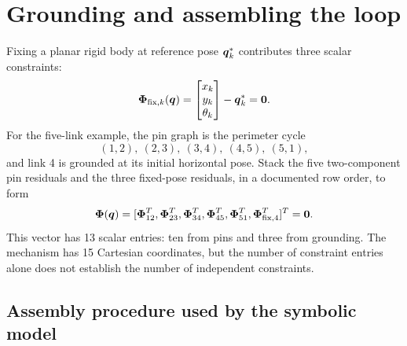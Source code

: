 \documentclass[../main.tex]{subfiles}
\begin{document}
\section{Grounding and assembling the loop}

Fixing a planar rigid body at reference pose $\boldsymbol{q}_k^*$ contributes three scalar constraints:
\begin{equation}
	\boldsymbol{\Phi}_{\mathrm{fix},k}(\boldsymbol{q})
	=\begin{bmatrix}x_k\\y_k\\\theta_k\end{bmatrix}-\boldsymbol{q}_k^*
	=\boldsymbol{0}.
	\label{eq:fixed-pose-constraint}
\end{equation}
For the five-link example, the pin graph is the perimeter cycle
\begin{equation}
	(1,2),\ (2,3),\ (3,4),\ (4,5),\ (5,1),
	\label{eq:five-link-pin-edges}
\end{equation}
and link 4 is grounded at its initial horizontal pose. Stack the five two-component pin residuals and the three fixed-pose residuals, in a documented row order, to form
\begin{equation}
	\boldsymbol{\Phi}(\boldsymbol{q})=
	[\boldsymbol{\Phi}_{12}^T,\boldsymbol{\Phi}_{23}^T,\boldsymbol{\Phi}_{34}^T,
	 \boldsymbol{\Phi}_{45}^T,\boldsymbol{\Phi}_{51}^T,
	 \boldsymbol{\Phi}_{\mathrm{fix},4}^T]^T=\boldsymbol{0}.
	\label{eq:five-link-constraint-vector}
\end{equation}
This vector has 13 scalar entries: ten from pins and three from grounding. The mechanism has 15 Cartesian coordinates, but the number of constraint entries alone does not establish the number of independent constraints.

\subsection{Assembly procedure used by the symbolic model}
\end{document}
